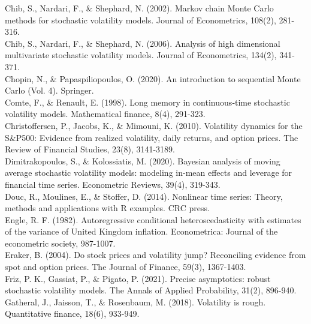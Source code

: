 \documentclass[
]{book}
\theoremstyle{break}
\theoremstyle{nonumberplain}
\begin{document}
Chib, S., Nardari, F., \& Shephard, N. (2002). Markov chain Monte Carlo
methods for stochastic volatility models. Journal of Econometrics,
108(2), 281-316.\\

Chib, S., Nardari, F., \& Shephard, N. (2006). Analysis of high
dimensional multivariate stochastic volatility models. Journal of
Econometrics, 134(2), 341-371.\\

Chopin, N., \& Papaspiliopoulos, O. (2020). An introduction to
sequential Monte Carlo (Vol. 4). Springer.\\

Comte, F., \& Renault, E. (1998). Long memory in continuous‐time
stochastic volatility models. Mathematical finance, 8(4), 291-323.\\

Christoffersen, P., Jacobs, K., \& Mimouni, K. (2010). Volatility
dynamics for the S\&P500: Evidence from realized volatility, daily
returns, and option prices. The Review of Financial Studies, 23(8),
3141-3189.\\

Dimitrakopoulos, S., \& Kolossiatis, M. (2020). Bayesian analysis of
moving average stochastic volatility models: modeling in-mean effects
and leverage for financial time series. Econometric Reviews, 39(4),
319-343.\\

Douc, R., Moulines, E., \& Stoffer, D. (2014). Nonlinear time series:
Theory, methods and applications with R examples. CRC press.\\

Engle, R. F. (1982). Autoregressive conditional heteroscedasticity with
estimates of the variance of United Kingdom inflation. Econometrica:
Journal of the econometric society, 987-1007.\\

Eraker, B. (2004). Do stock prices and volatility jump? Reconciling
evidence from spot and option prices. The Journal of Finance, 59(3),
1367-1403.\\

Friz, P. K., Gassiat, P., \& Pigato, P. (2021). Precise asymptotics:
robust stochastic volatility models. The Annals of Applied Probability,
31(2), 896-940.\\

Gatheral, J., Jaisson, T., \& Rosenbaum, M. (2018). Volatility is rough.
Quantitative finance, 18(6), 933-949.\\
\end{document}
